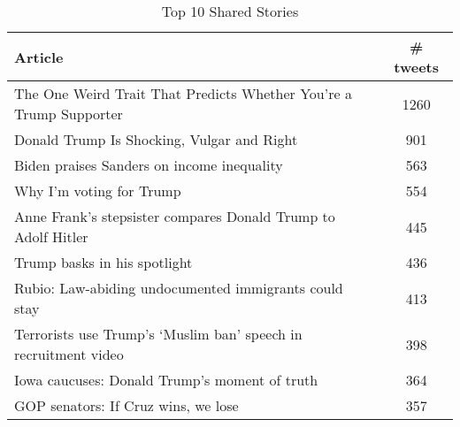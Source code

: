 \begin{table}
\begin{tabular}{ |l c| } 
    \hline
    Article &  \# tweets \\
    \hline
    The One Weird Trait That Predicts Whether You're a Trump Supporter &   1260 \\
    Donald Trump Is Shocking, Vulgar and Right                         &    901 \\
    Biden praises Sanders on income inequality                         &    563 \\
    Why I'm voting for Trump                                           &    554 \\
    Anne Frank's stepsister compares Donald Trump to Adolf Hitler      &    445 \\
    Trump basks in his spotlight                                       &    436 \\
    Rubio: Law-abiding undocumented immigrants could stay              &    413 \\
    Terrorists use Trump's `Muslim ban' speech in recruitment video    &    398 \\
    Iowa caucuses: Donald Trump's moment of truth                      &    364 \\
    GOP senators: If Cruz wins, we lose                                &    357 \\
    \hline
\end{tabular}
\caption{\label{tab:top-10}Top 10 Shared Stories}
\end{table}




                                                            
